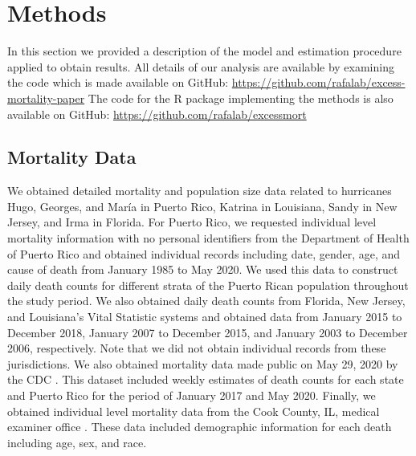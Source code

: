 \documentclass[11pt]{article}
\begin{document}
\section{Methods}
\label{sec:methods}

In this section we provided a description of the model and estimation procedure applied to obtain results. All details of our analysis are available by examining the code which is made available on GitHub: \url{https://github.com/rafalab/excess-mortality-paper}
The code for the R package implementing the methods is also available on GitHub: \url{https://github.com/rafalab/excessmort}

\subsection{Mortality Data}
\label{subsec:mortality-data}
We obtained detailed mortality and population size data related to hurricanes Hugo, Georges, and Mar\'ia in Puerto Rico, Katrina in Louisiana, Sandy in New Jersey, and Irma in Florida. For Puerto Rico, we requested individual level mortality information with no personal identifiers from the Department of Health of Puerto Rico and obtained individual records including date, gender, age, and cause of death from January 1985 to May 2020. We used this data to construct daily death counts for different strata of the Puerto Rican population throughout the study period. We also obtained daily death counts from Florida, New Jersey, and Louisiana’s Vital Statistic systems and obtained data from January 2015 to December 2018, January 2007 to December 2015, and January 2003 to December 2006, respectively. Note that we did not obtain individual records from these jurisdictions. We also obtained mortality data made public on May 29, 2020 by the CDC  \cite{cdc2020covid19}. This dataset included weekly estimates of death counts for each state and Puerto Rico for the period of January 2017 and May 2020. 
Finally, we obtained individual level mortality data from the Cook County, IL, medical examiner office \cite{cookcovid19}. These data included demographic information for each death including age, sex, and race.
\end{document}
